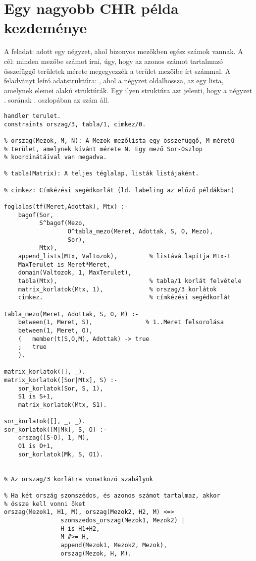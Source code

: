 \section{Egy nagyobb CHR példa kezdeménye}

A feladat: adott egy négyzet, ahol bizonyos mezőkben egész számok vannak.
A cél: minden mezőbe számot írni, úgy, hogy az azonos számot tartalmazó
összefüggő területek mérete megegyezzék a terület mezőibe írt számmal. 
\br
A feladványt leíró adatstruktúra: , ahol 
a négyzet oldalhossza, az  egy lista, amelynek elemei 
 alakú struktúrák. Egy ilyen struktúra azt jelenti, hogy a
négyzet . sorának . oszlopában az  szám áll.

\begin{verbatim}
handler terulet.
constraints orszag/3, tabla/1, cimkez/0.

% orszag(Mezok, M, N): A Mezok mezőlista egy összefüggő, M méretű
% terület, amelynek kívánt mérete N. Egy mező Sor-Oszlop
% koordinátáival van megadva.

% tabla(Matrix): A teljes téglalap, listák listájaként.

% cimkez: Címkézési segédkorlát (ld. labeling az előző példákban)

foglalas(tf(Meret,Adottak), Mtx) :-
    bagof(Sor,
          S^bagof(Mezo, 
                  O^tabla_mezo(Meret, Adottak, S, O, Mezo), 
                  Sor),
          Mtx),
    append_lists(Mtx, Valtozok),         % listává lapítja Mtx-t
    MaxTerulet is Meret*Meret,
    domain(Valtozok, 1, MaxTerulet),
    tabla(Mtx),                          % tabla/1 korlát felvétele
    matrix_korlatok(Mtx, 1),             % orszag/3 korlátok
    cimkez.                              % címkézési segédkorlát

tabla_mezo(Meret, Adottak, S, O, M) :-
    between(1, Meret, S),               % 1..Meret felsorolása
    between(1, Meret, O),
    (   member(t(S,O,M), Adottak) -> true
    ;   true
    ).

matrix_korlatok([], _).
matrix_korlatok([Sor|Mtx], S) :-
    sor_korlatok(Sor, S, 1),
    S1 is S+1,
    matrix_korlatok(Mtx, S1).

sor_korlatok([], _, _).
sor_korlatok([M|Mk], S, O) :-
    orszag([S-O], 1, M),
    O1 is O+1,
    sor_korlatok(Mk, S, O1).


% Az orszag/3 korlátra vonatkozó szabályok

% Ha két ország szomszédos, és azonos számot tartalmaz, akkor
% össze kell vonni őket
orszag(Mezok1, H1, M), orszag(Mezok2, H2, M) <=>
                szomszedos_orszag(Mezok1, Mezok2) |
                H is H1+H2,
                M #>= H,
                append(Mezok1, Mezok2, Mezok),
                orszag(Mezok, H, M).


\end{verbatim}

